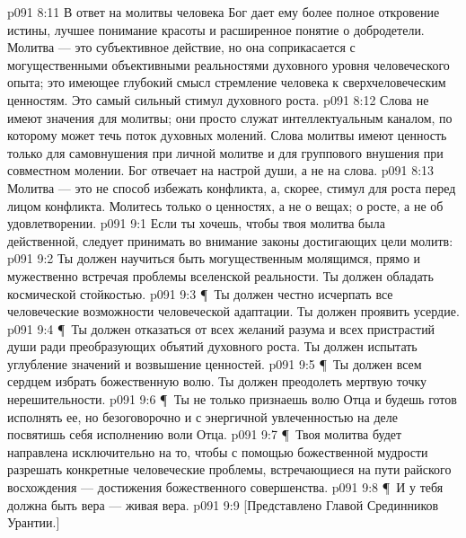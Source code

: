 \vs p091 8:11 В ответ на молитвы человека Бог дает ему более полное откровение истины, лучшее понимание красоты и расширенное понятие о добродетели. Молитва --- это субъективное действие, но она соприкасается с могущественными объективными реальностями духовного уровня человеческого опыта; это имеющее глубокий смысл стремление человека к сверхчеловеческим ценностям. Это самый сильный стимул духовного роста.
\vs p091 8:12 Слова не имеют значения для молитвы; они просто служат интеллектуальным каналом, по которому может течь поток духовных молений. Слова молитвы имеют ценность только для самовнушения при личной молитве и для группового внушения при совместном молении. Бог отвечает на настрой души, а не на слова.
\vs p091 8:13 Молитва --- это не способ избежать конфликта, а, скорее, стимул для роста перед лицом конфликта. Молитесь только о ценностях, а не о вещах; о росте, а не об удовлетворении.
\vs p091 9:1 Если ты хочешь, чтобы твоя молитва была действенной, следует принимать во внимание законы достигающих цели молитв:
\vs p091 9:2 \bibnobreakspace Ты должен научиться быть могущественным молящимся, прямо и мужественно встречая проблемы вселенской реальности. Ты должен обладать космической стойкостью.
\vs p091 9:3 \P\ \bibnobreakspace Ты должен честно исчерпать все человеческие возможности человеческой адаптации. Ты должен проявить усердие.
\vs p091 9:4 \P\ \bibnobreakspace Ты должен отказаться от всех желаний разума и всех пристрастий души ради преобразующих объятий духовного роста. Ты должен испытать углубление значений и возвышение ценностей.
\vs p091 9:5 \P\ \bibnobreakspace Ты должен всем сердцем избрать божественную волю. Ты должен преодолеть мертвую точку нерешительности.
\vs p091 9:6 \P\ \bibnobreakspace Ты не только признаешь волю Отца и будешь готов исполнять ее, но безоговорочно и с энергичной увлеченностью на деле посвятишь себя исполнению воли Отца.
\vs p091 9:7 \P\ \bibnobreakspace Твоя молитва будет направлена исключительно на то, чтобы с помощью божественной мудрости разрешать конкретные человеческие проблемы, встречающиеся на пути райского восхождения --- достижения божественного совершенства.
\vs p091 9:8 \P\ \bibnobreakspace И у тебя должна быть вера --- живая вера.
\vs p091 9:9 [Представлено Главой Срединников Урантии.]
